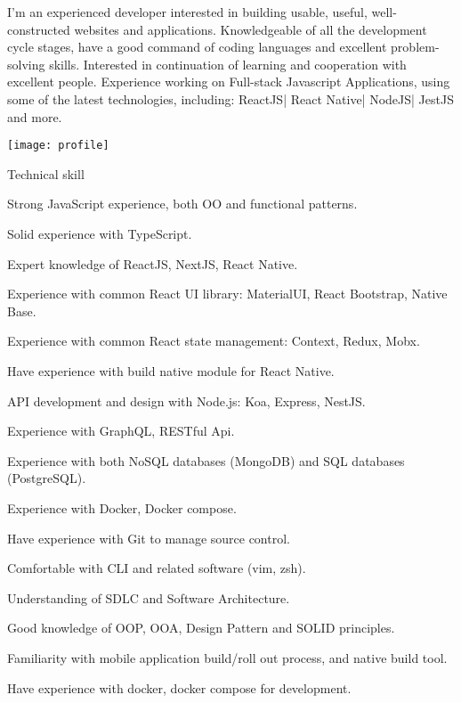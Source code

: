 \documentclass{resume}
\begin{document}

  \noindent\begin{minipage}{0.8\textwidth}%
    I'm an experienced developer interested in building usable, useful, well-constructed websites and applications. 
    Knowledgeable of all the development cycle stages, have a good command of coding languages and excellent problem-solving skills.
    Interested in continuation of learning and cooperation with excellent people.
    Experience working on Full-stack Javascript Applications, using some of the latest technologies, including:
    ReactJS| React Native| NodeJS| JestJS and more.
    \end{minipage}%
    \hfill%
    \begin{minipage}{0.1\textwidth}\raggedright
      \texttt{[image: profile]}
    \end{minipage}

  \begin{rSection}{Technical skill}
    \begin{rSubsection}{}{}{}{}
      \item Strong JavaScript experience, both OO and functional patterns.
      \item Solid experience with TypeScript.
      \item Expert knowledge of ReactJS, NextJS, React Native.
      \item Experience with common React UI library: MaterialUI, React Bootstrap, Native Base.
      \item Experience with common React state management: Context, Redux, Mobx.
      \item Have experience with build native module for React Native.

      \item API development and design with Node.js: Koa, Express, NestJS.
      \item Experience with GraphQL, RESTful Api.
      \item Experience with both NoSQL databases (MongoDB) and SQL databases (PostgreSQL).
      \item Experience with Docker, Docker compose.

      \item Have experience with Git to manage source control.
      \item Comfortable with CLI and related software (vim, zsh).
      \item Understanding of SDLC and Software Architecture.
      \item Good knowledge of OOP, OOA, Design Pattern and SOLID principles.
      \item Familiarity with mobile application build/roll out process, and native build tool.
      \item Have experience with docker, docker compose for development.
    \end{rSubsection}
  \end{rSection}
  
\end{document}
